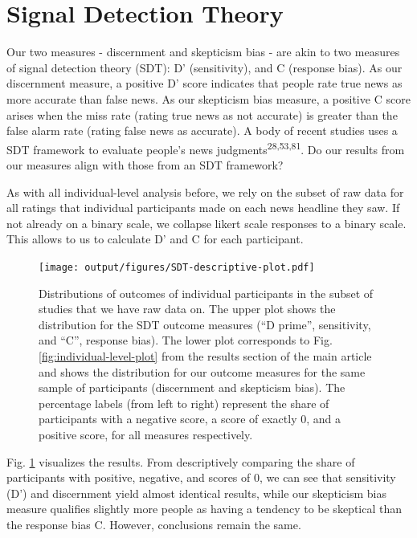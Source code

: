 \documentclass[
  man]{apa6}
\begin{document}
\section{Signal Detection Theory}\label{signal-detection-theory}

Our two measures - discernment and skepticism bias - are akin to two measures of signal detection theory (SDT): D' (sensitivity), and C (response bias). As our discernment measure, a positive D' score indicates that people rate true news as more accurate than false news. As our skepticism bias measure, a positive C score arises when the miss rate (rating true news as not accurate) is greater than the false alarm rate (rating false news as accurate). A body of recent studies uses a SDT framework to evaluate people's news judgments\textsuperscript{28,53,81}. Do our results from our measures align with those from an SDT framework?

As with all individual-level analysis before, we rely on the subset of raw data for all ratings that individual participants made on each news headline they saw. If not already on a binary scale, we collapse likert scale responses to a binary scale. This allows to us to calculate D' and C for each participant.



\begin{figure}
\centering
\texttt{[image: output/figures/SDT-descriptive-plot.pdf]}
\caption{\label{fig:SDT-descriptive-plot}Distributions of outcomes of individual participants in the subset of studies that we have raw data on. The upper plot shows the distribution for the SDT outcome measures (``D prime'', sensitivity, and ``C'', response bias). The lower plot corresponds to Fig. \ref{fig:individual-level-plot} from the results section of the main article and shows the distribution for our outcome measures for the same sample of participants (discernment and skepticism bias). The percentage labels (from left to right) represent the share of participants with a negative score, a score of exactly 0, and a positive score, for all measures respectively.}
\end{figure}

Fig. \ref{fig:SDT-descriptive-plot} visualizes the results. From descriptively comparing the share of participants with positive, negative, and scores of 0, we can see that sensitivity (D') and discernment yield almost identical results, while our skepticism bias measure qualifies slightly more people as having a tendency to be skeptical than the response bias C. However, conclusions remain the same.
\end{document}
